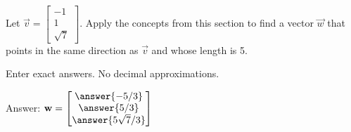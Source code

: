 \documentclass{ximera}
\begin{document}
\begin{problem}\label{prob:00364}
Let $\vec{v}=\begin{bmatrix}-1\\1\\\sqrt{7}\end{bmatrix}$.
Apply the concepts from this section to find a vector $\vec{w}$ that points in the same direction as $\vec{v}$ and whose length is 5.

Enter exact answers.  No decimal approximations.

Answer: $\vec{w}=\begin{bmatrix}
    \answer{-5/3}\\\answer{5/3}\\\answer{5\sqrt{7}/3}
\end{bmatrix}$
\end{problem}
\end{document}
